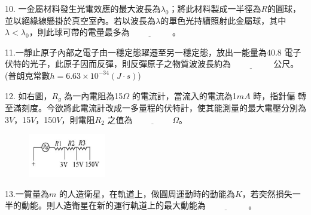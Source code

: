 \documentclass[cn,10pt,math=newtx,chinesefont=founder,device=ig]{elegantbook}
\begin{document}
\begin{example}
   10. 一金屬材料發生光電效應的最大波長為$\lambda_0$；將此材料製成一半徑為$R$的圓球，並以絕緣線懸掛於真空室內。若以波長為$\lambda$的單色光持續照射此金屬球，其中$\lambda < \lambda_0$，則此球可帶的電量最多為$\underline{\hspace{2cm}}$ 。\\
    \rightline{[中壢高中教甄109]}
\end{example}
\begin{solution}
    
\end{solution}

\newpage

\begin{example}
   11.一靜止原子內部之電子由一穩定態躍遷至另一穩定態，放出一能量為40.8 電子伏特的光子，此原子因而反彈，則反彈原子之物質波波長約為$\underline{\hspace{2cm}}$ 公尺。(普朗克常數$h=6.63\times10^{-34} (J\cdot s)$)\\
    \rightline{[中壢高中教甄109]}
\end{example}
\begin{solution}
    
\end{solution}

\newpage

\begin{example}
   12. 如右圖，$R_g$ 為一內電阻為15$\Omega$ 的電流計，當流入的電流為1$mA$ 時，指針偏
轉至滿刻度。今欲將此電流計改成一多量程的伏特計，使其能測量的最大電壓分別為3$V$，15$V$，150$V$，則電阻$R_2$ 之值為$\underline{\hspace{2cm}} \Omega$。\\
    \rightline{[中壢高中教甄109]}
\end{example}
\begin{solution}
    
\end{solution}
\begin{figure}[htbp]
    \flushright
    \includegraphics[width=0.3\textwidth]{image/109中壢12.png}
  \end{figure}
\newpage

\begin{example}
   13.一質量為$m$ 的人造衛星，在軌道上，做圓周運動時的動能為$K$，若突然損失一半的動能。則人造衛星在新的運行軌道上的最大動能為$\underline{\hspace{2cm}}$ 。\\
    \rightline{[中壢高中教甄109]}
\end{example}
\begin{solution}
    
\end{solution}
\end{document}
